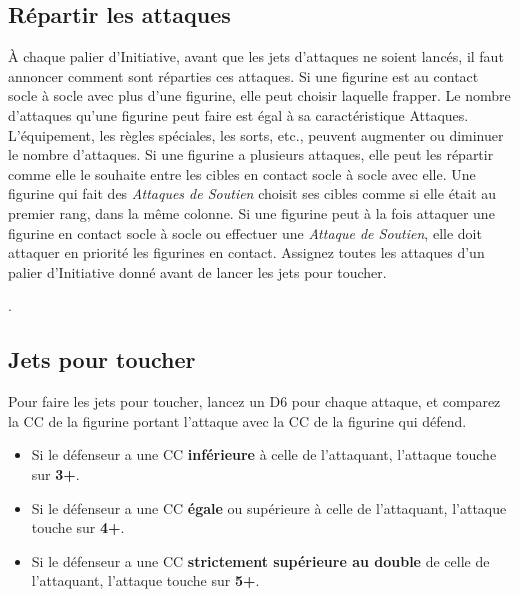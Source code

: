 \subsection{Répartir les attaques}

À chaque palier d'Initiative, avant que les jets d'attaques ne soient lancés, il faut annoncer comment sont réparties ces attaques. Si une figurine est au contact socle à socle avec plus d'une figurine, elle peut choisir laquelle frapper. Le nombre d'attaques qu'une figurine peut faire est égal à sa caractéristique Attaques. L'équipement, les règles spéciales, les sorts, etc., peuvent augmenter ou diminuer le nombre d'attaques. Si une figurine a plusieurs attaques, elle peut les répartir comme elle le souhaite entre les cibles en contact socle à socle avec elle. Une figurine qui fait des \emph{Attaques de Soutien} choisit ses cibles comme si elle était au premier rang, dans la même colonne. Si une figurine peut à la fois attaquer une figurine en contact socle à socle ou effectuer une \emph{Attaque de Soutien}, elle doit attaquer en priorité les figurines en contact. Assignez toutes les attaques d'un palier d'Initiative donné avant de lancer les jets pour toucher.

.

\subsection{Jets pour toucher}

Pour faire les jets pour toucher, lancez un D6 pour chaque attaque, et comparez la CC de la figurine portant l'attaque avec la CC de la figurine qui défend.
\begin{itemize}[label={-}]
\item Si le défenseur a une CC \textbf{inférieure} à celle de l'attaquant, l'attaque touche sur \textbf{3+}.
\item Si le défenseur a une CC \textbf{égale} ou supérieure à celle de l'attaquant, l'attaque touche sur \textbf{4+}.
\item Si le défenseur a une CC \textbf{strictement supérieure au double} de celle de l'attaquant, l'attaque touche sur \textbf{5+}.
\end{itemize}

